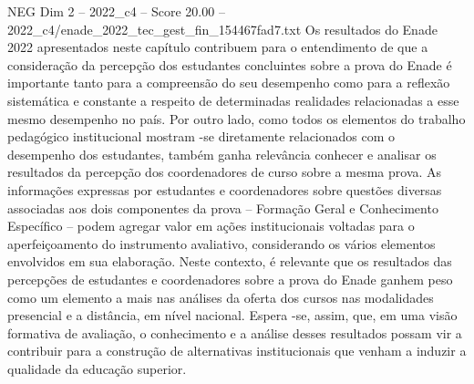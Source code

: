 \begin{textsample}{NEG Dim 2 – 2022\_c4 – Score 20.00 – 2022\_c4/enade\_2022\_tec\_gest\_fin\_154467fad7.txt}
Os resultados do Enade 2022 apresentados neste capítulo contribuem para o entendimento de que a consideração da percepção dos estudantes concluintes sobre a prova do Enade é importante tanto para a compreensão do seu desempenho como para a reflexão sistemática e constante a respeito de determinadas realidades relacionadas a esse mesmo desempenho no país.
Por outro lado, como todos os elementos do trabalho pedagógico institucional mostram -se diretamente relacionados com o desempenho dos estudantes, também ganha relevância conhecer e analisar os resultados da percepção dos coordenadores de curso sobre a mesma prova.
As informações expressas por estudantes e coordenadores sobre questões diversas associadas aos dois componentes da prova – Formação Geral e Conhecimento Específico – podem agregar valor em ações institucionais voltadas para o aperfeiçoamento do instrumento avaliativo, considerando os vários elementos envolvidos em sua elaboração.
Neste contexto, é relevante que os resultados das percepções de estudantes e coordenadores sobre a prova do Enade ganhem peso como um elemento a mais nas análises da oferta dos cursos nas modalidades presencial e a distância, em nível nacional.
Espera -se, assim, que, em uma visão formativa de avaliação, o conhecimento e a análise desses resultados possam vir a contribuir para a construção de alternativas institucionais que venham a induzir a qualidade da educação superior.

\end{textsample}
